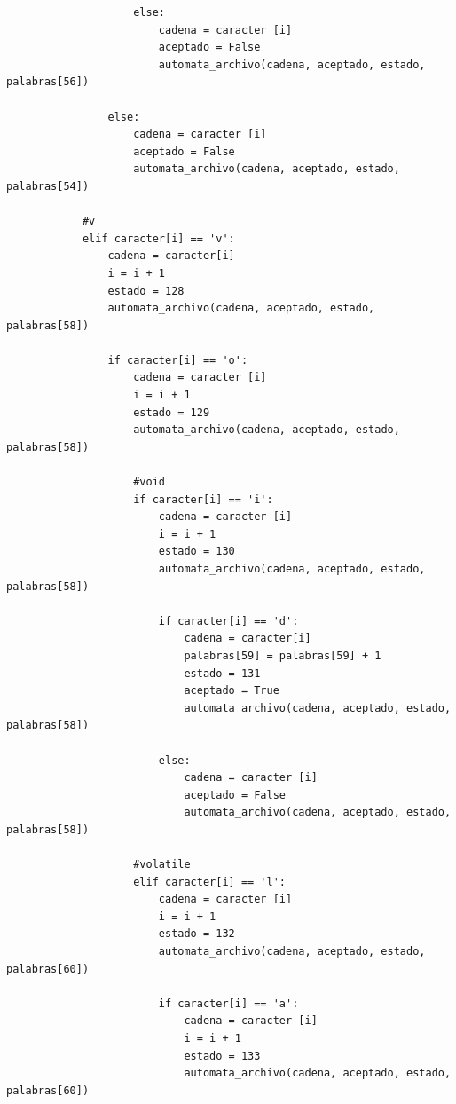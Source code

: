 \documentclass{article}
\begin{document}
\begin{flushleft}
\begin{lstlisting}
                    else:
                        cadena = caracter [i]
                        aceptado = False
                        automata_archivo(cadena, aceptado, estado, palabras[56])
                
                else:
                    cadena = caracter [i]
                    aceptado = False
                    automata_archivo(cadena, aceptado, estado, palabras[54])
            
            #v
            elif caracter[i] == 'v':
                cadena = caracter[i]
                i = i + 1
                estado = 128
                automata_archivo(cadena, aceptado, estado, palabras[58])
                    
                if caracter[i] == 'o':
                    cadena = caracter [i]
                    i = i + 1
                    estado = 129
                    automata_archivo(cadena, aceptado, estado, palabras[58])  
                    
                    #void
                    if caracter[i] == 'i':
                        cadena = caracter [i]
                        i = i + 1
                        estado = 130
                        automata_archivo(cadena, aceptado, estado, palabras[58])
                            
                        if caracter[i] == 'd':
                            cadena = caracter[i]
                            palabras[59] = palabras[59] + 1
                            estado = 131
                            aceptado = True
                            automata_archivo(cadena, aceptado, estado, palabras[58])
                                
                        else:
                            cadena = caracter [i]
                            aceptado = False
                            automata_archivo(cadena, aceptado, estado, palabras[58])
                            
                    #volatile
                    elif caracter[i] == 'l':
                        cadena = caracter [i]
                        i = i + 1
                        estado = 132
                        automata_archivo(cadena, aceptado, estado, palabras[60])
                        
                        if caracter[i] == 'a':
                            cadena = caracter [i]
                            i = i + 1
                            estado = 133
                            automata_archivo(cadena, aceptado, estado, palabras[60])
                            

\end{lstlisting}
\end{flushleft}
\end{document}
